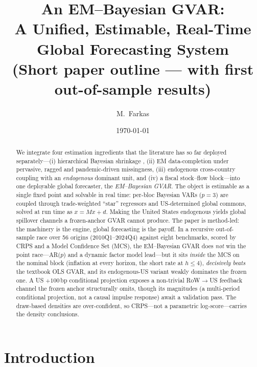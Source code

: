 \documentclass[11pt]{article}
\title{\textbf{An EM--Bayesian GVAR:\\ A Unified, Estimable, Real-Time Global Forecasting System}\\[4pt]
\large{(Short paper outline --- with first out-of-sample results)}}
\author{M.\ Farkas}
\date{\today}
\begin{document}
\maketitle

\begin{abstract}
\noindent We integrate four estimation ingredients that the literature has so far deployed
separately---(i) hierarchical Bayesian shrinkage \citep{GiannoneLenzaPrimiceri2019},
(ii) EM data-completion under pervasive, ragged and pandemic-driven missingness,
(iii) endogenous cross-country coupling with an \emph{endogenous} dominant unit, and
(iv) a fiscal stock--flow block---into one deployable global forecaster, the
\emph{EM--Bayesian GVAR}. The object is estimable as a single fixed point and solvable in
real time: per-bloc Bayesian VARs ($p{=}3$) are coupled through trade-weighted ``star''
regressors and US-determined global commons, solved at run time as $x = Mx + d$. Making the
United States endogenous yields global spillover channels a frozen-anchor GVAR cannot
produce. The paper is method-led: the machinery is the engine, global forecasting is the
payoff. In a recursive out-of-sample race over 56 origins (2010Q1--2024Q4) against eight
benchmarks, scored by CRPS and a Model Confidence Set (MCS), the EM--Bayesian GVAR does
\emph{not} win the point race---AR($p$) and a dynamic factor model lead---but it sits
\emph{inside} the MCS on the nominal block (inflation at every horizon, the short rate at
$h\le4$), \emph{decisively beats} the textbook OLS GVAR, and its endogenous-US variant
weakly dominates the frozen one. A US $+100$\,bp conditional projection exposes a
non-trivial RoW$\to$US feedback channel the frozen anchor structurally omits, though its
magnitudes (a multi-period conditional projection, not a causal impulse response) await a
validation pass. The draw-based densities are over-confident, so CRPS---not a parametric
log-score---carries the density conclusions.
\end{abstract}

\section{Introduction}
\end{document}
